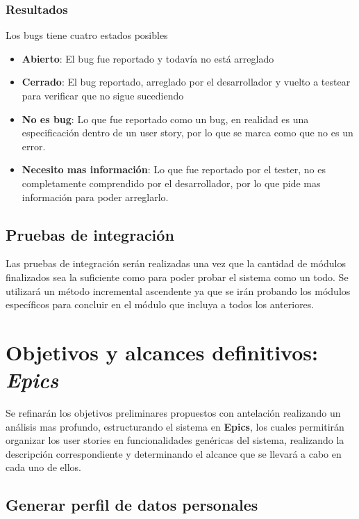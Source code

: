 \subsubsection{Resultados}

Los bugs tiene cuatro estados posibles
\begin{itemize}
	\item \textbf{Abierto}: El bug fue reportado y todavía no está arreglado
    \item \textbf{Cerrado}: El bug reportado, arreglado por el desarrollador y vuelto a testear para verificar que no sigue sucediendo
    \item \textbf{No es bug}:  Lo que fue reportado como un bug, en realidad es una especificación dentro de un user story, por lo que se marca como que no es un error.
    \item \textbf{Necesito mas información}: Lo que fue reportado por el tester, no es completamente comprendido por el desarrollador, por lo que pide mas información para poder arreglarlo.
\end{itemize}

\subsection{Pruebas de integración}
Las pruebas de integración serán realizadas una vez que la cantidad de módulos finalizados sea la suficiente como para poder probar el sistema como un todo. Se utilizará un método incremental ascendente ya que se irán probando los módulos específicos para concluir en el módulo que incluya a todos los anteriores.

\section{Objetivos y alcances definitivos: \textit{Epics}}
Se refinarán los objetivos preliminares propuestos con antelación realizando un análisis mas profundo, estructurando el sistema en \textbf{Epics}, los cuales permitirán organizar los user stories en funcionalidades genéricas del sistema, realizando la descripción correspondiente y  determinando el alcance que se llevará a cabo en cada uno de ellos.
 
\subsection{Generar perfil de datos personales}

